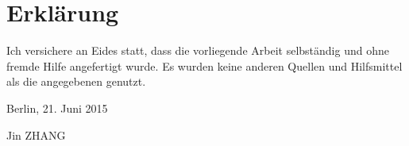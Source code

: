 \chapter*{Erklärung}

Ich versichere an Eides statt, dass die vorliegende Arbeit selbständig und ohne fremde Hilfe angefertigt wurde. Es wurden keine anderen Quellen und Hilfsmittel als die angegebenen genutzt.

Berlin, 21. Juni 2015

Jin ZHANG